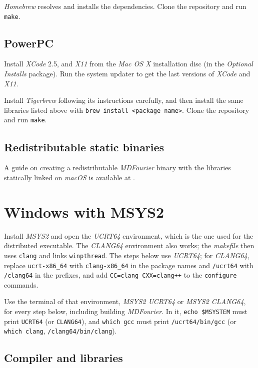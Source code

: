 \documentclass[10pt,a4paper]{report}
\begin{document}
\begin{appendices}
\textit{Homebrew} resolves and installs the dependencies. Clone the repository and run \texttt{make}.

\subsection{PowerPC}

Install \textit{XCode} 2.5, and \textit{X11} from the \textit{Mac OS X} installation disc (in the \textit{Optional Installs} package). Run the system updater to get the last versions of \textit{XCode} and \textit{X11}.

Install \textit{Tigerbrew} \cite{tigerbrew} following its instructions carefully, and then install the same libraries listed above with \texttt{brew install <package name>}. Clone the repository and run \texttt{make}.

\subsection{Redistributable static binaries}

A guide on creating a redistributable \textit{MDFourier} binary with the libraries statically linked on \textit{macOS} is available at \cite{macstatic}.

\section{Windows with MSYS2}

Install \textit{MSYS2} \cite{msys2} and open the \textit{UCRT64} environment, which is the one used for the distributed executable. The \textit{CLANG64} environment also works; the \textit{makefile} then uses \texttt{clang} and links \texttt{winpthread}. The steps below use \textit{UCRT64}; for \textit{CLANG64}, replace \texttt{ucrt-x86\_64} with \texttt{clang-x86\_64} in the package names and \texttt{/ucrt64} with \texttt{/clang64} in the prefixes, and add \texttt{CC=clang CXX=clang++} to the \texttt{configure} commands.

Use the terminal of that environment, \textit{MSYS2 UCRT64} or \textit{MSYS2 CLANG64}, for every step below, including building \textit{MDFourier}. In it, \texttt{echo \$MSYSTEM} must print \texttt{UCRT64} (or \texttt{CLANG64}), and \texttt{which gcc} must print \texttt{/ucrt64/bin/gcc} (or \texttt{which clang}, \texttt{/clang64/bin/clang}). 

\subsection{Compiler and libraries}


\end{appendices}
\end{document}
